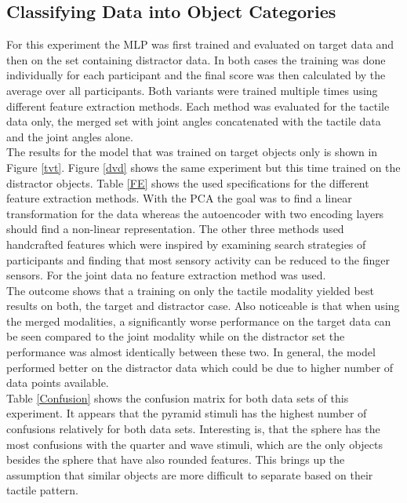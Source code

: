 \subsection{Classifying Data into Object Categories}\label{e2}
For this experiment the MLP was first trained and evaluated on target data and then on the set containing distractor data. In both cases the training was done individually for each participant and the final score was then calculated by the average over all participants. Both variants were trained multiple times using different feature extraction methods. Each method was evaluated for the tactile data only, the merged set with joint angles concatenated with the tactile data and the joint angles alone.\\ 
The results for the model that was trained on target objects only is shown in Figure \ref{tvt}. Figure \ref{dvd} shows the same experiment but this time trained on the distractor objects. Table \ref{FE} shows the used specifications for the different feature extraction methods. With the PCA the goal was to find a linear transformation for the data whereas the autoencoder with two encoding layers should find a non-linear representation. The other three methods used handcrafted features which were inspired by examining search strategies of participants and finding that most sensory activity can be reduced to the finger sensors. For the joint data no feature extraction method was used. \\
The outcome shows that a training on only the tactile modality yielded best results on both, the target and distractor case. Also noticeable is that when using the merged modalities, a significantly worse performance on the target data can be seen compared to the joint modality while on the distractor set the performance was almost identically between these two. In general, the model performed better on the distractor data which could be due to higher number of data points available.\\
Table \ref{Confusion} shows the confusion matrix for both data sets of this experiment. It appears that the pyramid stimuli has the highest number of confusions relatively for both data sets. Interesting is, that the sphere has the most confusions with the quarter and wave stimuli, which are the only objects besides the sphere that have also rounded features. This brings up the assumption that similar objects are more difficult to separate based on their tactile pattern. 

